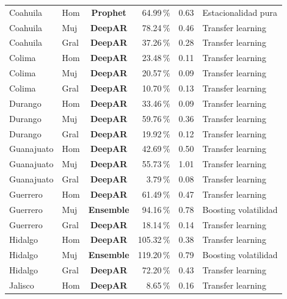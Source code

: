 \documentclass[12pt, letterpaper]{article}
\begin{document}
\begin{longtable}{l l >{\bfseries}c r r l}
Coahuila & Hom & \textcolor{cprophet}{\textbf{Prophet}} & 64.99\,\% & 0.63 & Estacionalidad pura \\
Coahuila & Muj & \textcolor{cdeepar}{\textbf{DeepAR}} & 78.24\,\% & 0.46 & Transfer learning \\
Coahuila & Gral & \textcolor{cdeepar}{\textbf{DeepAR}} & 37.26\,\% & 0.28 & Transfer learning \\
Colima & Hom & \textcolor{cdeepar}{\textbf{DeepAR}} & 23.48\,\% & 0.11 & Transfer learning \\
Colima & Muj & \textcolor{cdeepar}{\textbf{DeepAR}} & 20.57\,\% & 0.09 & Transfer learning \\
Colima & Gral & \textcolor{cdeepar}{\textbf{DeepAR}} & 10.70\,\% & 0.13 & Transfer learning \\
Durango & Hom & \textcolor{cdeepar}{\textbf{DeepAR}} & 33.46\,\% & 0.09 & Transfer learning \\
Durango & Muj & \textcolor{cdeepar}{\textbf{DeepAR}} & 59.76\,\% & 0.36 & Transfer learning \\
Durango & Gral & \textcolor{cdeepar}{\textbf{DeepAR}} & 19.92\,\% & 0.12 & Transfer learning \\
Guanajuato & Hom & \textcolor{cdeepar}{\textbf{DeepAR}} & 42.69\,\% & 0.50 & Transfer learning \\
Guanajuato & Muj & \textcolor{cdeepar}{\textbf{DeepAR}} & 55.73\,\% & 1.01 & Transfer learning \\
Guanajuato & Gral & \textcolor{cdeepar}{\textbf{DeepAR}} & 3.79\,\% & 0.08 & Transfer learning \\
Guerrero & Hom & \textcolor{cdeepar}{\textbf{DeepAR}} & 61.49\,\% & 0.47 & Transfer learning \\
Guerrero & Muj & \textcolor{censemble}{\textbf{Ensemble}} & 94.16\,\% & 0.78 & Boosting volatilidad \\
Guerrero & Gral & \textcolor{cdeepar}{\textbf{DeepAR}} & 18.14\,\% & 0.14 & Transfer learning \\
Hidalgo & Hom & \textcolor{cdeepar}{\textbf{DeepAR}} & 105.32\,\% & 0.38 & Transfer learning \\
Hidalgo & Muj & \textcolor{censemble}{\textbf{Ensemble}} & 119.20\,\% & 0.79 & Boosting volatilidad \\
Hidalgo & Gral & \textcolor{cdeepar}{\textbf{DeepAR}} & 72.20\,\% & 0.43 & Transfer learning \\
Jalisco & Hom & \textcolor{cdeepar}{\textbf{DeepAR}} & 8.65\,\% & 0.16 & Transfer learning \\

\end{longtable}
\end{document}
